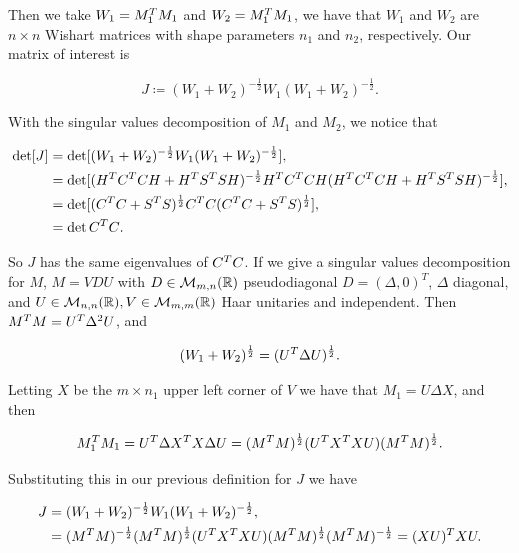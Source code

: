 Then we take $W_1 = M_1^TM_1$ and $W_2 = M_1^TM_1$, we have that $W_1$ and $W_2$ are $n\times n$ Wishart matrices with shape parameters $n_1$ and $n_2$, respectively. Our matrix of interest is

\begin{equation*}
    J \coloneqq (W_1 + W_2)^{-\frac12} W_1 (W_1 + W_2)^{-\frac12}.
\end{equation*}

    With the singular values decomposition of $M_1$ and $M_2$, we notice that 

\begin{align*}
    \det[J] &= \det[(W_1 + W_2)^{-\frac12} W_1 (W_1 + W_2)^{-\frac12}],\\ 
    &= \det[(H^T C^T C H + H^T S^TS H)^{-\frac12}H^T C^T C H(H^T C^T C H + H^T S^TS H)^{-\frac12}],\\
    &= \det[(C^T C + S^T S)^{\frac12}C^TC (C^T C + S^T S)^{\frac12}],\\
    &= \det{C^TC}.
\end{align*}

So $J$ has the same eigenvalues of $C^TC$. If we give a singular values decomposition for $M$, $M = VDU$ with $D \in \mathcal M_{m,n}(\mathbb R)$ pseudodiagonal $D = (\Delta, 0)^T$, $\Delta$ diagonal, and $U \in \mathcal M_{n,n}(\mathbb R),V \in \mathcal M_{m,m}(\mathbb R)$ Haar unitaries and independent. Then $M^T M = U^T \Delta^2 U$, and

\begin{equation*}
    (W_1 + W_2)^{\frac12} = (U^T \Delta U)^{\frac12}.
\end{equation*}

Letting $X$ be the $m\times n_1$ upper left corner of $V$ we have that $M_1 = U\Delta X$, and then

\begin{equation*}
    M_1^TM_1 = U^T \Delta X^T X \Delta U = (M^T M)^{\frac12} (U^T X^T X U)  (M^T M)^{\frac12}.
\end{equation*}

Substituting this in our previous definition for $J$ we have

\begin{align*}
    J &= (W_1 + W_2)^{-\frac12} W_1 (W_1 + W_2)^{-\frac12},\\ &= (M^T M)^{-\frac12} (M^T M)^{\frac12} (U^T X^T X U)  (M^T M)^{\frac12} (M^T M)^{-\frac12} = (XU)^TXU.
\end{align*}

